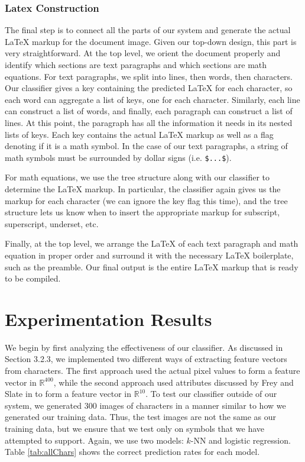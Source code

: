\documentclass[10pt]{IEEEtran}
\newcommand{\latex}{\LaTeX\xspace}
\begin{document}
\subsubsection{Latex Construction}

The final step is to connect all the parts of our system and generate the actual \latex markup for the document image. Given our top-down design, this part is very straightforward. At the top level, we orient the document properly and identify which sections are text paragraphs and which sections are math equations. For text paragraphs, we split into lines, then words, then characters. Our classifier gives a key containing the predicted \latex for each character, so each word can aggregate a list of keys, one for each character. Similarly, each line can construct a list of words, and finally, each paragraph can construct a list of lines. At this point, the paragraph has all the information it needs in its nested lists of keys. Each key contains the actual \latex markup as well as a flag denoting if it is a math symbol. In the case of our text paragraphs, a string of math symbols must be surrounded by dollar signs (i.e. \texttt{\$...\$}).

For math equations, we use the tree structure along with our classifier to determine the \latex markup. In particular, the classifier again gives us the markup for each character (we can ignore the key flag this time), and the tree structure lets us know when to insert the appropriate markup for subscript, superscript, underset, etc.

Finally, at the top level, we arrange the \latex of each text paragraph and math equation in proper order and surround it with the necessary \latex boilerplate, such as the preamble. Our final output is the entire \latex markup that is ready to be compiled.

\section{Experimentation Results}

We begin by first analyzing the effectiveness of our classifier. As discussed in Section 3.2.3, we implemented two different ways of extracting feature vectors from characters. The first approach used the actual pixel values to form a feature vector in $\mathbb{R}^{400}$, while the second approach used attributes discussed by Frey and Slate in \cite{2} to form a feature vector in $\mathbb{R}^{10}$. To test our classifier outside of our system, we generated $300$ images of characters in a manner similar to how we generated our training data. Thus, the test images are not the same as our training data, but we ensure that we test only on symbols that we have attempted to support. Again, we use two models: $k$-NN and logistic regression. Table \ref{tab:allChars} shows the correct prediction rates for each model.
\end{document}
